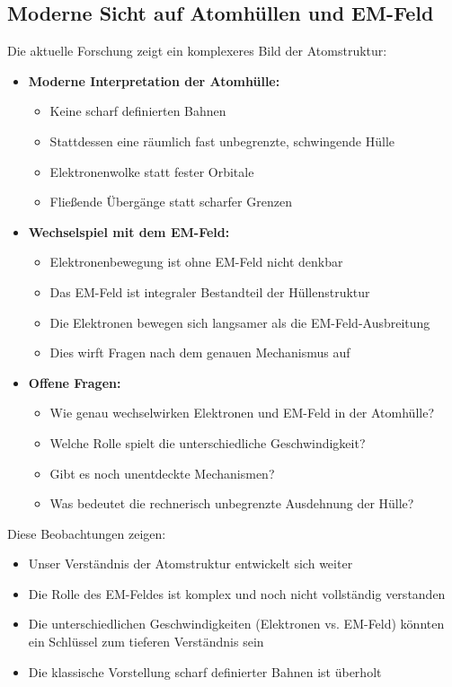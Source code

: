 \documentclass[12pt,a4paper]{article}
\begin{document}
	\subsection{Moderne Sicht auf Atomhüllen und EM-Feld}
	
	Die aktuelle Forschung zeigt ein komplexeres Bild der Atomstruktur:
	
	\begin{itemize}
		\item \textbf{Moderne Interpretation der Atomhülle:}
		\begin{itemize}
			\item Keine scharf definierten Bahnen
			\item Stattdessen eine räumlich fast unbegrenzte, schwingende Hülle
			\item Elektronenwolke statt fester Orbitale
			\item Fließende Übergänge statt scharfer Grenzen
		\end{itemize}
		
		\item \textbf{Wechselspiel mit dem EM-Feld:}
		\begin{itemize}
			\item Elektronenbewegung ist ohne EM-Feld nicht denkbar
			\item Das EM-Feld ist integraler Bestandteil der Hüllenstruktur
			\item Die Elektronen bewegen sich langsamer als die EM-Feld-Ausbreitung
			\item Dies wirft Fragen nach dem genauen Mechanismus auf
		\end{itemize}
		
		\item \textbf{Offene Fragen:}
		\begin{itemize}
			\item Wie genau wechselwirken Elektronen und EM-Feld in der Atomhülle?
			\item Welche Rolle spielt die unterschiedliche Geschwindigkeit?
			\item Gibt es noch unentdeckte Mechanismen?
			\item Was bedeutet die rechnerisch unbegrenzte Ausdehnung der Hülle?
		\end{itemize}
	\end{itemize}
	
	Diese Beobachtungen zeigen:
	\begin{itemize}
		\item Unser Verständnis der Atomstruktur entwickelt sich weiter
		\item Die Rolle des EM-Feldes ist komplex und noch nicht vollständig verstanden
		\item Die unterschiedlichen Geschwindigkeiten (Elektronen vs. EM-Feld) könnten ein Schlüssel zum tieferen Verständnis sein
		\item Die klassische Vorstellung scharf definierter Bahnen ist überholt
	\end{itemize}
	
\end{document}
